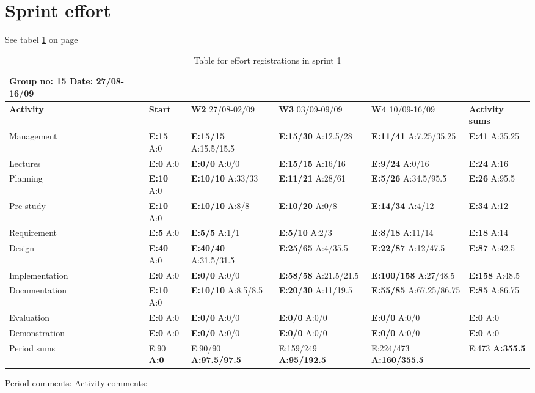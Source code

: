 \section{Sprint effort}
See tabel \ref{tab:effortweekss1} on page \pageref{tab:effortweekss1}
\begin{table}
\begin{tabularx}{\linewidth}{>{\setlength\hsize{.625\hsize}}X|>{\setlength\hsize{0.3\hsize}}X|>{\setlength\hsize{0.5\hsize}}X|>{\setlength\hsize{0.5\hsize}}X|>{\setlength\hsize{0.5\hsize}}X|>{\setlength\hsize{.3\hsize}}X}
Group no: 15 Date: 27/08-16/09  \\ \hline
\textbf{Activity} & \textbf{Start} & \textbf{W2} 27/08-02/09 & \textbf{W3} 03/09-09/09 & \textbf{W4} 10/09-16/09 & \textbf{Activity sums} \\ \hline \hline
Management & \textbf{E:15} A:0 & \textbf{E:15/15} A:15.5/15.5 & \textbf{E:15/30} A:12.5/28 & \textbf{E:11/41} A:7.25/35.25 & \textbf{E:41} A:35.25  \\ \hline
Lectures & \textbf{E:0} A:0 & \textbf{E:0/0} A:0/0 & \textbf{E:15/15} A:16/16 & \textbf{E:9/24} A:0/16 & \textbf{E:24 } A:16  \\ \hline
Planning & \textbf{E:10} A:0 & \textbf{E:10/10} A:33/33 & \textbf{E:11/21} A:28/61 & \textbf{E:5/26} A:34.5/95.5 & \textbf{E:26 } A:95.5  \\ \hline
Pre study & \textbf{E:10} A:0 & \textbf{E:10/10} A:8/8 & \textbf{E:10/20} A:0/8 & \textbf{E:14/34} A:4/12 & \textbf{E:34 } A:12  \\ \hline
Requirement & \textbf{E:5} A:0 & \textbf{E:5/5} A:1/1 & \textbf{E:5/10} A:2/3 & \textbf{E:8/18} A:11/14 & \textbf{E:18 } A:14  \\ \hline
Design & \textbf{E:40} A:0 & \textbf{E:40/40} A:31.5/31.5 & \textbf{E:25/65} A:4/35.5 & \textbf{E:22/87} A:12/47.5 & \textbf{E:87 } A:42.5  \\ \hline
Implementation & \textbf{E:0} A:0 & \textbf{E:0/0} A:0/0 & \textbf{E:58/58} A:21.5/21.5 & \textbf{E:100/158} A:27/48.5 & \textbf{E:158 } A:48.5  \\ \hline
Documentation & \textbf{E:10} A:0 & \textbf{E:10/10} A:8.5/8.5 & \textbf{E:20/30} A:11/19.5 & \textbf{E:55/85} A:67.25/86.75 & \textbf{E:85 } A:86.75  \\ \hline
Evaluation & \textbf{E:0} A:0 & \textbf{E:0/0} A:0/0 & \textbf{E:0/0} A:0/0 & \textbf{E:0/0} A:0/0 & \textbf{E:0 } A:0  \\ \hline
Demonstration & \textbf{E:0} A:0 & \textbf{E:0/0} A:0/0 & \textbf{E:0/0} A:0/0 & \textbf{E:0/0} A:0/0 & \textbf{E:0 } A:0  \\ \hline
Period sums & E:90 \textbf{A:0} & E:90/90 \textbf{A:97.5/97.5} & E:159/249 \textbf{A:95/192.5} & E:224/473 \textbf{A:160/355.5} & E:473 \textbf{A:355.5}
\end{tabularx}

Period comments: 
\newline
\newline
Activity comments:
\caption{Table for effort registrations in sprint 1} \label{tab:effortweekss1}
\end{table}

